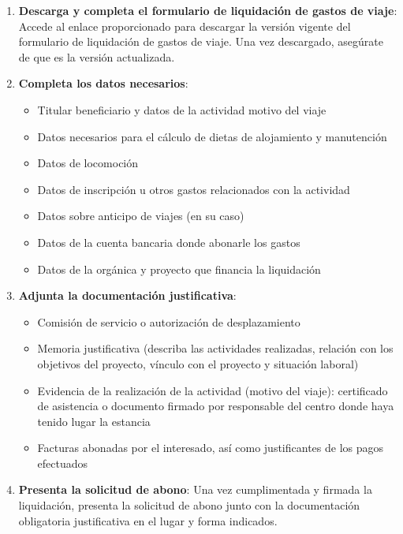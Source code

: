 \documentclass{article}
\begin{document}
\begin{itemize}
            \begin{enumerate}
                \item \textbf{Descarga y completa el formulario de liquidación de gastos de viaje}: Accede al enlace proporcionado para descargar la versión vigente del formulario de liquidación de gastos de viaje. Una vez descargado, asegúrate de que es la versión actualizada.
                \item \textbf{Completa los datos necesarios}:
                \begin{itemize}
                    \item Titular beneficiario y datos de la actividad motivo del viaje
                    \item Datos necesarios para el cálculo de dietas de alojamiento y manutención
                    \item Datos de locomoción
                    \item Datos de inscripción u otros gastos relacionados con la actividad
                    \item Datos sobre anticipo de viajes (en su caso)
                    \item Datos de la cuenta bancaria donde abonarle los gastos
                    \item Datos de la orgánica y proyecto que financia la liquidación
                \end{itemize}
                \item \textbf{Adjunta la documentación justificativa}:
                \begin{itemize}
                    \item Comisión de servicio o autorización de desplazamiento
                    \item Memoria justificativa (describa las actividades realizadas, relación con los objetivos del proyecto, vínculo con el proyecto y situación laboral)
                    \item Evidencia de la realización de la actividad (motivo del viaje): certificado de asistencia o documento firmado por responsable del centro donde haya tenido lugar la estancia
                    \item Facturas abonadas por el interesado, así como justificantes de los pagos efectuados
                \end{itemize}
                \item \textbf{Presenta la solicitud de abono}: Una vez cumplimentada y firmada la liquidación, presenta la solicitud de abono junto con la documentación obligatoria justificativa en el lugar y forma indicados.
            \end{enumerate}


\end{itemize}
\end{document}
